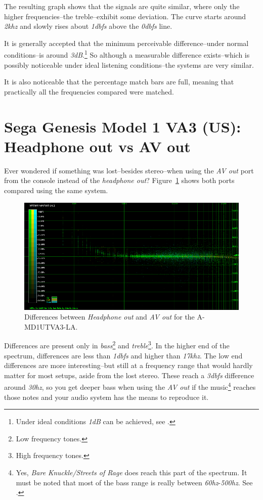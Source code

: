 \documentclass[10pt,a4paper]{report}
\newcommand{\hz}[1]{\textit{\mbox{#1\acrshort{hz}}}}
\newcommand{\khz}[1]{\textit{\mbox{#1\acrshort{khz}}}}
\newcommand{\db}[1]{\textit{\mbox{#1\acrshort{dbfs}}}}
\begin{document}
The resulting graph shows that the signals are quite similar, where only the higher frequencies--the treble--exhibit some deviation. The curve starts around \khz{2} and slowly rises about \db{1} above the \db{0} line.

It is generally accepted that the minimum perceivable difference--under normal conditions--is around \textit{3dB}.\footnote{Under ideal conditions \textit{1dB} can be achieved, see \cite{dbdiff}.} So although a measurable difference exists--which is possibly noticeable under ideal listening conditions--the systems are very similar.

It is also noticeable that the percentage match bars are full, meaning that practically all the frequencies compared were matched.

\section{Sega Genesis Model 1 VA3 (US):\\ Headphone out vs AV out}

Ever wondered if something was lost--besides stereo--when using the \textit{AV out} port from the console instead of the \textit{headphone out}? Figure~\ref{fig:A-MD1UTVA3-LA_vs_A-MD1UTVA3-AV-LA} shows both ports compared using the same system.

\begin{figure}[H]
	\centering
	\includegraphics[width=1.0\linewidth]{images/results/1-A-MD1UTVA3-LA_vs_A-MD1UTVA3-AV-LA.png}
	\caption[A-MD1UTVA3-LA AV Out]{Differences between \textit{Headphone out} and \textit{AV out} for the A-MD1UTVA3-LA.}
	\label{fig:A-MD1UTVA3-LA_vs_A-MD1UTVA3-AV-LA}
\end{figure}

Differences are present only in \textit{bass}\footnote{Low frequency tones.} and \textit{treble}\footnote{High frequency tones.}. In the higher end of the spectrum, differences are less than \db{1} and higher than \khz{17}. The low end differences are more interesting--but still at a frequency range that would hardly matter for most setups, aside from the lost stereo. These reach a \db{3} difference around \hz{30}, so you get deeper bass when using the \textit{AV out} if the music\footnote{Yes, \textit{Bare Knuckle/Streets of Rage} does reach this part of the spectrum. It must be noted that most of the bass range is really between \hz{60}-\hz{500}. See \cite{bass}.} reaches those notes and your audio system has the means to reproduce it.
\end{document}
